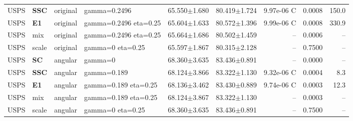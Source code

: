 \begin{longtable}{lllp{.14\linewidth}rrrrr}
USPS & \textbf{SSC} & original & gamma=0.2496 & 65.550$\pm$1.680 & 80.419$\pm$1.724 & 9.97e-06 C & 0.0008 & 150.0\\
USPS & \textbf{E1} & original & gamma=0.2496 eta=0.25 & 65.604$\pm$1.633 & 80.572$\pm$1.396 & 9.99e-06 C & 0.0008 & 330.9\\
USPS & mix & original & gamma=0.2496 eta=0.25 & 65.664$\pm$1.686 & 80.502$\pm$1.459 & -- & 0.0006 & --\\
USPS & scale & original & gamma=0 eta=0.25 & 65.597$\pm$1.867 & 80.315$\pm$2.128 & -- & 0.7500 & --\\
USPS & \textbf{SC} & angular & gamma=0 & 68.360$\pm$3.635 & 83.436$\pm$0.891 & -- & 0.0000 & --\\
USPS & \textbf{SSC} & angular & gamma=0.189 & 68.124$\pm$3.866 & 83.322$\pm$1.130 & 9.32e-06 C & 0.0004 & 8.3\\
USPS & \textbf{E1} & angular & gamma=0.189 eta=0.25 & 68.136$\pm$3.462 & 83.430$\pm$0.889 & 9.74e-06 C & 0.0003 & 12.3\\
USPS & mix & angular & gamma=0.189 eta=0.25 & 68.124$\pm$3.867 & 83.322$\pm$1.130 & -- & 0.0003 & --\\
USPS & scale & angular & gamma=0 eta=0.25 & 68.360$\pm$3.635 & 83.436$\pm$0.891 & -- & 0.7500 & --\\
\bottomrule\end{longtable}\endgroup
